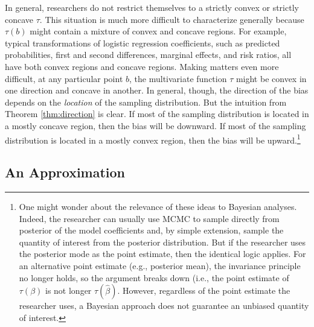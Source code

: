 \documentclass[12pt]{article}
\begin{document}
In general, researchers do not restrict themselves to a strictly convex or strictly concave $\tau$.  
This situation is much more difficult to characterize generally because $\tau(b)$ might contain a mixture of convex and concave regions. 
For example, typical transformations of logistic regression coefficients, such as predicted probabilities, first and second differences, marginal effects, and risk ratios, all have both convex regions and concave regions.
Making matters even more difficult, at any particular point $b$, the multivariate function $\tau$ might be convex in one direction and concave in another. 
In general, though, the direction of the bias depends on the \textit{location} of the sampling distribution. 
But the intuition from Theorem \ref{thm:direction} is clear.
If most of the sampling distribution is located in a mostly concave region, then the bias will be downward. 
If most of the sampling distribution is located in a mostly convex region, then the bias will be upward.\footnote{One might wonder about the relevance of these ideas to Bayesian analyses. 
Indeed, the researcher can usually use MCMC to sample directly from posterior of the model coefficients and, by simple extension, sample the quantity of interest from the posterior distribution. 
But if the researcher uses the posterior mode as the point estimate, then the identical logic applies. 
For an alternative point estimate (e.g., posterior mean), the invariance principle no longer holds, so the argument breaks down (i.e., the point estimate of $\tau(\beta)$ is not longer $\tau(\hat{\beta})$. 
However, regardless of the point estimate the researcher uses, a Bayesian approach does not guarantee an unbiased quantity of interest.}

\subsection*{An Approximation}
\end{document}
